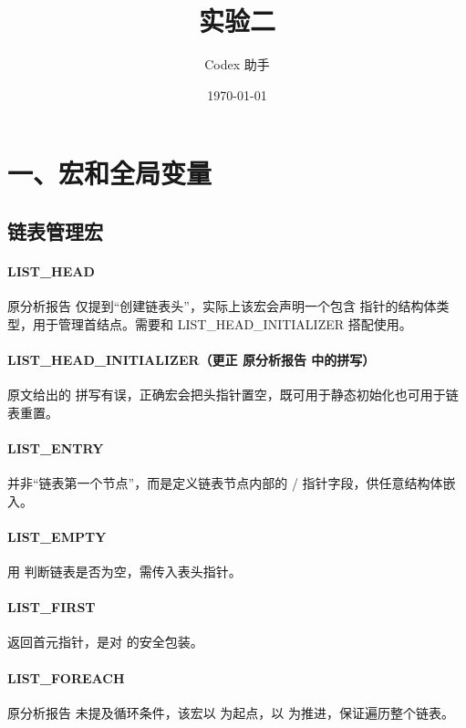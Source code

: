 \documentclass[12pt,oneside]{ctexbook}
\title{实验二\\\large {\ProjectName}}
\author{Codex 助手}
\date{\today}
\begin{document}
\tableofcontents
\mainmatter

\section*{一、宏和全局变量}

\subsection*{链表管理宏}
\paragraph{LIST\_HEAD}
原分析报告 仅提到“创建链表头”，实际上该宏会声明一个包含  指针的结构体类型，用于管理首结点。需要和 LIST\_HEAD\_INITIALIZER 搭配使用。

\paragraph{LIST\_HEAD\_INITIALIZER（更正 原分析报告 中的拼写）}
原文给出的  拼写有误，正确宏会把头指针置空，既可用于静态初始化也可用于链表重置。

\paragraph{LIST\_ENTRY}
并非“链表第一个节点”，而是定义链表节点内部的 / 指针字段，供任意结构体嵌入。

\paragraph{LIST\_EMPTY}
用  判断链表是否为空，需传入表头指针。

\paragraph{LIST\_FIRST}
返回首元指针，是对  的安全包装。

\paragraph{LIST\_FOREACH}
原分析报告 未提及循环条件，该宏以  为起点，以  为推进，保证遍历整个链表。
\end{document}
